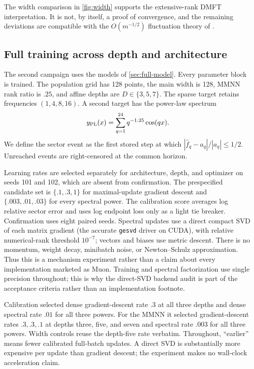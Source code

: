 \documentclass[11pt]{article}
\newcommand{\1}{\mathbf 1}
\theoremstyle{plain}
\theoremstyle{definition}
\begin{document}
The width comparison in \cref{fig:width} supports the extensive-rank DMFT
interpretation.  It is not, by itself, a proof of convergence, and the
remaining deviations are compatible with the \(O(m^{-1/2})\) fluctuation
theory of \citet{bordelon2023finite}.

\subsection{Full training across depth and architecture}
\label{sec:full-experiments}

The second campaign uses the models of \cref{sec:full-model}.  Every
parameter block is trained.  The population grid has 128 points, the main
width is 128, MMNN rank ratio is \(.25\), and affine depths are
\(D\in\{3,5,7\}\).  The sparse target retains frequencies
\((1,4,8,16)\).  A second target has the power-law spectrum
\begin{equation}
 y_{\rm PL}(x)=\sum_{q=1}^{24}q^{-1.25}\cos(qx).
 \label{eq:powerlaw-target}
\end{equation}
We define the sector event as the first stored step at which
\(|\widehat f_q-a_q|/|a_q|\leq1/2\).  Unreached events are right-censored at
the common horizon.

Learning rates are selected separately for architecture, depth, and
optimizer on seeds 101 and 102, which are absent from confirmation.  The
prespecified candidate set is \(\{.1,.3,1\}\) for maximal-update gradient
descent and \(\{.003,.01,.03\}\) for every spectral power.  The calibration
score averages log relative sector error and uses log endpoint loss only as
a light tie breaker.  Confirmation uses eight paired seeds.  Spectral
updates use a direct compact SVD of each matrix gradient (the accurate
\texttt{gesvd} driver on CUDA), with relative numerical-rank threshold
$10^{-7}$; vectors and biases use metric descent.
There is no momentum, weight decay, minibatch noise, or Newton--Schulz
approximation.  Thus this is a mechanism experiment rather than a claim
about every implementation marketed as Muon.  Training and spectral
factorization use single precision throughout; this is why the direct-SVD
backend audit is part of the acceptance criteria rather than an
implementation footnote.

Calibration selected dense gradient-descent rate $.3$ at all three depths
and dense spectral rate $.01$ for all three powers.  For the MMNN it selected
gradient-descent rates $.3,.3,.1$ at depths three, five, and seven and
spectral rate $.003$ for all three powers.  Width controls reuse the
depth-five rate verbatim.
Throughout, ``earlier'' means fewer calibrated full-batch updates.  A direct
SVD is substantially more expensive per update than gradient descent; the
experiment makes no wall-clock acceleration claim.
\end{document}
